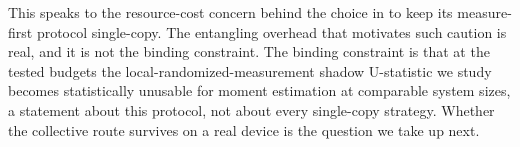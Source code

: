 %
%

This speaks to the resource-cost concern behind the choice in
\cite{qmladvantage2026} to keep its measure-first protocol single-copy.
The entangling overhead that motivates such caution is real, and it is not
the binding constraint. The binding constraint is that at the tested budgets
the local-randomized-measurement shadow U-statistic we study becomes
statistically unusable for moment estimation at comparable system sizes,
a statement about this protocol, not about every single-copy
strategy. Whether the collective route survives on a real device is the
question we take up next.
